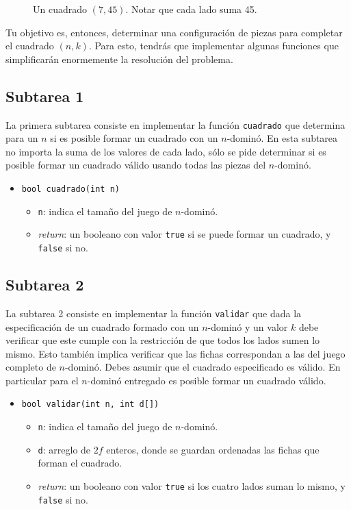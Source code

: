 \documentclass{oci}
\begin{document}
\begin{figure}[ht]
 \centering
 
 \caption{Un cuadrado $(7,45)$. Notar que cada lado suma 45.}
 \label{f:cuadrado7}
\end{figure}

Tu objetivo es, entonces, determinar una configuración de piezas para completar el cuadrado $(n,k)$.
Para esto, tendrás que implementar algunas funciones que simplificarán enormemente la resolución del problema.



\subsection*{Subtarea 1}
La primera subtarea consiste en implementar la función \verb+cuadrado+ que determina para un $n$ si es posible formar un cuadrado con un $n$-dominó.
En esta subtarea no importa la suma de los valores de cada lado, sólo se pide determinar si es posible formar un cuadrado válido usando todas las piezas del $n$-dominó.

\begin{itemize}
 \item \verb+bool cuadrado(int n)+
 \begin{itemize}
  \item \verb+n+: indica el tamaño del juego de $n$-dominó.
  \item \emph{return}: un booleano con valor \verb+true+ si se puede formar un cuadrado, y \verb+false+ si no.
 \end{itemize}
\end{itemize}

\subsection*{Subtarea 2}
La subtarea 2 consiste en implementar la función \verb+validar+ que dada la especificación de un cuadrado formado con un $n$-dominó y un valor $k$ debe verificar que este cumple con la restricción de que todos los lados sumen lo mismo.
Esto también implica verificar que las fichas correspondan a las del juego completo de $n$-dominó.
Debes asumir que el cuadrado especificado es válido.
En particular para el $n$-dominó entregado es posible formar un cuadrado válido.

\begin{itemize}
 \item \verb+bool validar(int n, int d[])+
 \begin{itemize}
  \item \verb+n+: indica el tamaño del juego de $n$-dominó.
  \item \verb+d+: arreglo de $2f$ enteros, donde se guardan ordenadas las fichas que forman el cuadrado.
  \item \emph{return}: un booleano con valor \verb+true+ si los cuatro lados suman lo mismo, y \verb+false+ si no.
 \end{itemize}
\end{itemize}
\end{document}
